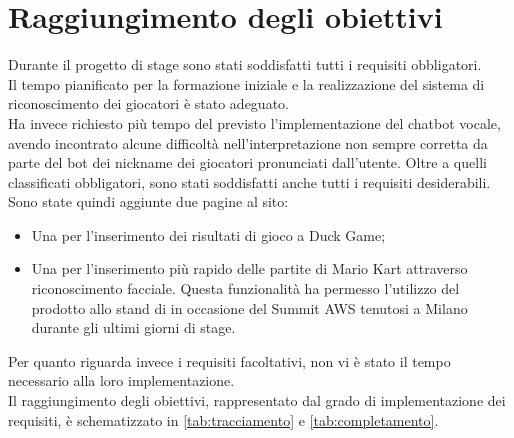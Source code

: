 \section{Raggiungimento degli obiettivi}
Durante il progetto di stage sono stati soddisfatti tutti i requisiti obbligatori. \\
Il tempo pianificato per la formazione iniziale e la realizzazione del sistema di riconoscimento dei giocatori è stato adeguato. \\
Ha invece richiesto più tempo del previsto l'implementazione del \gls{chatbot} vocale, avendo incontrato alcune difficoltà nell'interpretazione non sempre corretta da parte del bot dei nickname dei giocatori pronunciati dall'utente.
Oltre a quelli classificati obbligatori, sono stati soddisfatti anche tutti i requisiti desiderabili. Sono state quindi aggiunte due pagine al sito: 
\begin{itemize}
	\item Una per l'inserimento dei risultati di gioco a Duck Game;
	\item Una per l'inserimento più rapido delle partite di Mario Kart attraverso riconoscimento facciale. Questa
	funzionalità ha permesso l'utilizzo del prodotto allo stand di \azienda in occasione del Summit \gls{AWS} tenutosi a Milano durante gli ultimi giorni di stage.
\end{itemize}

\noindent Per quanto riguarda invece i requisiti facoltativi, non vi è stato il tempo necessario alla loro implementazione. \\

\noindent Il raggiungimento degli obiettivi, rappresentato dal grado di implementazione dei requisiti, è schematizzato in \autoref{tab:tracciamento} e \autoref{tab:completamento}.

